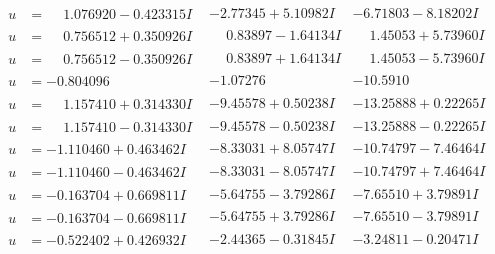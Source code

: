 \documentclass[1p]{elsarticle_modified}
\theoremstyle{definition}
\begin{document}
$$\begin{array}{c|c|c}
\begin{aligned}
u &= \phantom{-}1.076920 - 0.423315 I\end{aligned}
 & -2.77345 + 5.10982 I & -6.71803 - 8.18202 I \\ \hline\begin{aligned}
u &= \phantom{-}0.756512 + 0.350926 I\end{aligned}
 & \phantom{-}0.83897 - 1.64134 I & \phantom{-}1.45053 + 5.73960 I \\ \hline\begin{aligned}
u &= \phantom{-}0.756512 - 0.350926 I\end{aligned}
 & \phantom{-}0.83897 + 1.64134 I & \phantom{-}1.45053 - 5.73960 I \\ \hline\begin{aligned}
u &= -0.804096\phantom{ +0.000000I}\end{aligned}
 & -1.07276\phantom{ +0.000000I} & -10.5910\phantom{ +0.000000I} \\ \hline\begin{aligned}
u &= \phantom{-}1.157410 + 0.314330 I\end{aligned}
 & -9.45578 + 0.50238 I & -13.25888 + 0.22265 I \\ \hline\begin{aligned}
u &= \phantom{-}1.157410 - 0.314330 I\end{aligned}
 & -9.45578 - 0.50238 I & -13.25888 - 0.22265 I \\ \hline\begin{aligned}
u &= -1.110460 + 0.463462 I\end{aligned}
 & -8.33031 + 8.05747 I & -10.74797 - 7.46464 I \\ \hline\begin{aligned}
u &= -1.110460 - 0.463462 I\end{aligned}
 & -8.33031 - 8.05747 I & -10.74797 + 7.46464 I \\ \hline\begin{aligned}
u &= -0.163704 + 0.669811 I\end{aligned}
 & -5.64755 - 3.79286 I & -7.65510 + 3.79891 I \\ \hline\begin{aligned}
u &= -0.163704 - 0.669811 I\end{aligned}
 & -5.64755 + 3.79286 I & -7.65510 - 3.79891 I \\ \hline\begin{aligned}
u &= -0.522402 + 0.426932 I\end{aligned}
 & -2.44365 - 0.31845 I & -3.24811 - 0.20471 I \\ \hline\begin{aligned}

\end{aligned}
\end{array}$$
\end{document}
